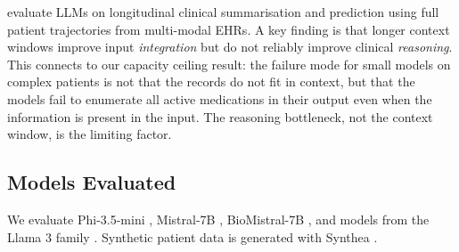 \citet{kruse2025temporal} evaluate LLMs on longitudinal clinical summarisation and
prediction using full patient trajectories from multi-modal EHRs. A key finding is
that longer context windows improve input \textit{integration} but do not reliably
improve clinical \textit{reasoning}. This connects to our capacity ceiling result:
the failure mode for small models on complex patients is not that the records do not
fit in context, but that the models fail to enumerate all active medications in their
output even when the information is present in the input. The reasoning bottleneck, not
the context window, is the limiting factor.

\subsection{Models Evaluated}

We evaluate Phi-3.5-mini \citep{abdin2024phi3}, Mistral-7B \citep{jiang2023mistral},
BioMistral-7B \citep{labrak2024biomistral}, and models from the Llama 3 family
\citep{llama3team2024}. Synthetic patient data is generated with Synthea
\citep{walonoski2018synthea}.
